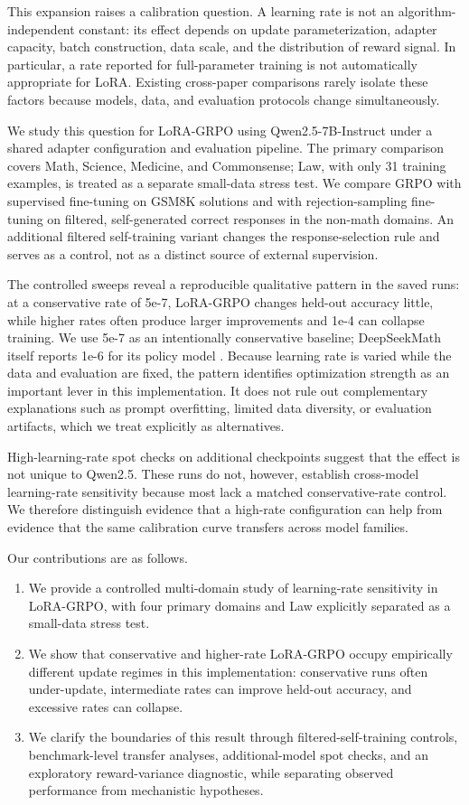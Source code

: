 \documentclass[11pt]{article}
\begin{document}
This expansion raises a calibration question. A learning rate is not an algorithm-independent constant: its effect depends on update parameterization, adapter capacity, batch construction, data scale, and the distribution of reward signal. In particular, a rate reported for full-parameter training is not automatically appropriate for LoRA. Existing cross-paper comparisons rarely isolate these factors because models, data, and evaluation protocols change simultaneously.

We study this question for LoRA-GRPO using Qwen2.5-7B-Instruct under a shared adapter configuration and evaluation pipeline. The primary comparison covers Math, Science, Medicine, and Commonsense; Law, with only 31 training examples, is treated as a separate small-data stress test. We compare GRPO with supervised fine-tuning on GSM8K solutions and with rejection-sampling fine-tuning on filtered, self-generated correct responses in the non-math domains. An additional filtered self-training variant changes the response-selection rule and serves as a control, not as a distinct source of external supervision.

The controlled sweeps reveal a reproducible qualitative pattern in the saved runs: at a conservative rate of 5e-7, LoRA-GRPO changes held-out accuracy little, while higher rates often produce larger improvements and 1e-4 can collapse training. We use 5e-7 as an intentionally conservative baseline; DeepSeekMath itself reports 1e-6 for its policy model \citep{shao2024deepseekmath}. Because learning rate is varied while the data and evaluation are fixed, the pattern identifies optimization strength as an important lever in this implementation. It does not rule out complementary explanations such as prompt overfitting, limited data diversity, or evaluation artifacts, which we treat explicitly as alternatives.

High-learning-rate spot checks on additional checkpoints suggest that the effect is not unique to Qwen2.5. These runs do not, however, establish cross-model learning-rate sensitivity because most lack a matched conservative-rate control. We therefore distinguish evidence that a high-rate configuration can help from evidence that the same calibration curve transfers across model families.

Our contributions are as follows.
\begin{enumerate}
\item We provide a controlled multi-domain study of learning-rate sensitivity in LoRA-GRPO, with four primary domains and Law explicitly separated as a small-data stress test.
\item We show that conservative and higher-rate LoRA-GRPO occupy empirically different update regimes in this implementation: conservative runs often under-update, intermediate rates can improve held-out accuracy, and excessive rates can collapse.
\item We clarify the boundaries of this result through filtered-self-training controls, benchmark-level transfer analyses, additional-model spot checks, and an exploratory reward-variance diagnostic, while separating observed performance from mechanistic hypotheses.
\end{enumerate}
\end{document}
